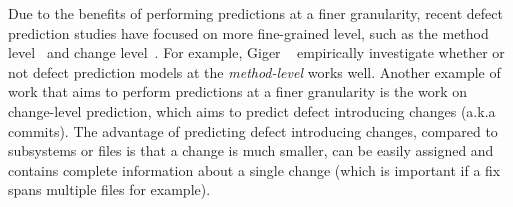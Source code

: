 


Due to the benefits of performing predictions at a finer granularity, recent defect prediction studies have focused on more fine-grained level, such as the method level~\cite{Kim2007ICSE,Hata2012ICSE,Giger2012EMSE} and change level~\cite{Aversano2007,Kim2008TSE,kamei2013tse}. For example, Giger \ea ~\cite{Giger2012EMSE} empirically investigate whether or not defect prediction models at the \emph{method-level} works well. Another example of work that aims to perform predictions at a finer granularity is the work on change-level prediction, which aims to predict defect introducing changes (a.k.a commits). The advantage of predicting defect introducing changes, compared to subsystems or files is that a change is much smaller, can be easily assigned and contains complete information about a single change (which is important if a fix spans multiple files for example).




